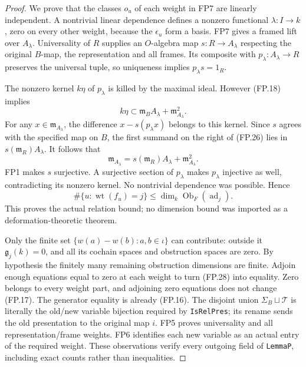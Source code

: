 \begin{proof}
We prove that the classes $o_u$ of each weight in FP7 are linearly
independent.  A nontrivial linear dependence defines a nonzero
functional $\lambda:I\to k$, zero on every other weight, because
the $\epsilon_u$ form a basis.
FP7 gives a framed lift over $A_\lambda$.
Universality of $R$ supplies an $O$-algebra map
$s:R\to A_\lambda$ respecting the original $B$-map, the
representation and all frames.
Its composite with $p_\lambda:A_\lambda\to R$ preserves the
universal tuple, so uniqueness implies $p_\lambda s=1_R$.

The nonzero kernel $k\eta$ of $p_\lambda$ is killed by the maximal
ideal.  However (FP.18) implies
\[
       k\eta\subset\mathfrak m_BA_\lambda+\mathfrak m_{A_\lambda}^2.
 \tag{FP.26}
\]
For any $x\in\mathfrak m_{A_\lambda}$, the difference
$x-s(p_\lambda x)$ belongs to this kernel.
Since $s$ agrees with the specified map on $B$,
the first summand on the right of (FP.26) lies in
$s(\mathfrak m_R)A_\lambda$.
It follows that
\[
 \mathfrak m_{A_\lambda}
          =s(\mathfrak m_R)A_\lambda+\mathfrak m_{A_\lambda}^2.
 \tag{FP.27}
\]
FP1 makes $s$ surjective.  A surjective section of $p_\lambda$
makes $p_\lambda$ injective as well, contradicting its nonzero
kernel.  No nontrivial dependence was possible.  Hence
\[
   \#\{u:\operatorname{wt}(f_u)=j\}
        \le\dim_k\operatorname{Ob}_F(\operatorname{ad}_j).
 \tag{FP.28}
\]
This proves the actual relation bound; no dimension bound was
imported as a deformation-theoretic theorem.

Only the finite set $\{w(a)-w(b):a,b\in\iota\}$ can contribute:
outside it $\mathfrak g_j(k)=0$, and all its cochain spaces and
obstruction spaces are zero.
By hypothesis the finitely many remaining obstruction dimensions
are finite.  Adjoin enough equations equal to zero at each weight
to turn (FP.28) into equality.
Zero belongs to every weight part, and adjoining zero equations
does not change (FP.17).
The generator equality is already (FP.16).
The disjoint union $\Sigma_B\sqcup\mathcal T$ is literally the
old/new variable bijection required by \texttt{IsRelPres}; its
rename sends the old presentation to the original map $i$.
FP5 proves universality and all representation/frame weights.
FP6 identifies each new variable as an actual entry of the
required weight.  These observations verify every outgoing field
of \texttt{LemmaP}, including exact counts rather than inequalities.
\end{proof}

